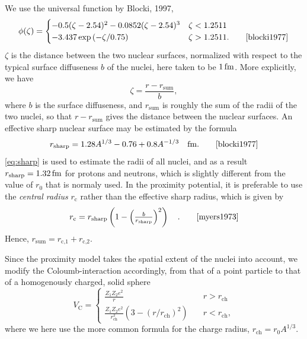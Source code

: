 We use the universal function by Blocki, 1997,
\begin{equation}
\phi(\zeta)= \begin{cases}-0.5(\zeta-2.54)^2-0.0852(\zeta-2.54)^3 & \zeta < 1.2511 \\
-3.437\exp{(-\zeta/0.75)} & \zeta > 1.2511.\qquad\cite{blocki1977}
\end{cases}\label{eq:prox}
\end{equation}
$\zeta$ is the distance between the two nuclear surfaces, normalized with respect to the typical surface diffuseness $b$ of the nuclei, here taken to be $\unit[1]{fm}$\cite{blocki1977}. More explicitly, we have
\begin{equation}
\zeta = \frac{r - r_\text{sum}}{b},
\end{equation}
where $b$ is the surface diffuseness, and $r_\text{sum}$ is roughly the sum of the radii of the two nuclei, so that $r-r_\text{sum}$ gives the distance between the nuclear surfaces\cite{blocki1977}. An effective sharp nuclear surface may be estimated by the formula
\begin{equation}
r_\text{sharp} = 1.28 A^{1/3} - 0.76 + 0.8 A^{-1/3}\quad\unit{fm}.\qquad\cite{blocki1977}\label{eq:sharp}
\end{equation}
\autoref{eq:sharp} is used to estimate the radii of all nuclei, and as a result $r_\text{sharp}=\unit[1.32]{fm}$ for protons and neutrons, which is slightly different from the value of $r_0$ that is normaly used.
In the proximity potential, it is preferable to use the \emph{central radius} $r_\text{c}$ rather than the effective sharp radius\cite{blocki1977}, which is given by 
\begin{equation}
r_\text{c} =r_\text{sharp} \left(1-\left(\tfrac{b}{r_\text{sharp}}\right)^2\right)\quad.\qquad\cite{myers1973}
\end{equation}
Hence, $r_\text{sum} = r_\text{c,1}+r_\text{c,2}$. 


Since the proximity model takes the spatial extent of the nuclei into account, we modify the Coloumb-interaction accordingly, from that of a point particle to that of a homogenously charged, solid sphere
\begin{equation}
V_\text{C} = \begin{cases}\frac{Z_1 Z_2 e^2}{r} &\quad r>r_\text{ch} \\ \frac{Z_1 Z_2 e^2}{r_\text{ch}^2}(3-(r/r_\text{ch})^2) &\quad r<r_\text{ch}, \end{cases}
\end{equation}
where we here use the more common formula for the charge radius, $r_\text{ch} = r_0 A^{1/3}$.

